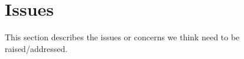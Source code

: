 \section{Issues}\label{sec:issues}

This section describes the issues or concerns we think need to be raised/addressed.
